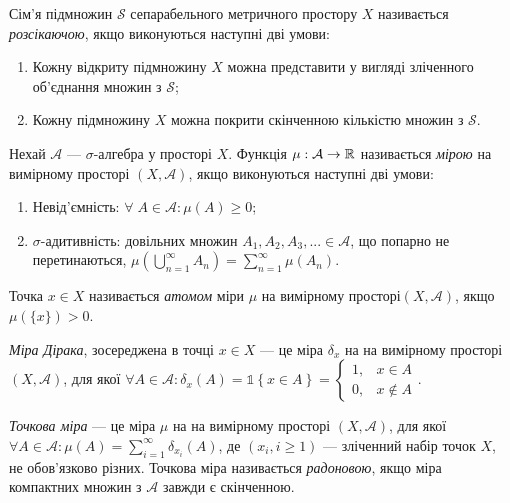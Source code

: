 \begin{definition}
    Сім'я підмножин $\mathcal{S}$ сепарабельного метричного простору $X$ називається
    \emph{розсікаючою}, якщо виконуються наступні дві умови:
    \begin{enumerate}
        \item Кожну відкриту підмножину $X$ можна представити у 
        вигляді зліченного об'єднання множин з $\mathcal{S}$;
        \item Кожну підмножину $X$ можна покрити скінченною кількістю множин з $\mathcal{S}$.
    \end{enumerate}
\end{definition}
\begin{definition}
    Нехай $\mathcal{A}$ --- $\sigma$-алгебра
    у просторі $X$. Функція $\mu: \mathcal{A} \to \mathbb{R}$ називається
    \emph{мірою} на вимірному просторі $\left(X, \mathcal{A}\right)$, якщо виконуються наступні дві умови:
    \begin{enumerate}
        \item Невід'ємність: $\forall \; A \in \mathcal{A} : \mu(A) \geq 0$;
        \item $\sigma$-адитивність: довільних множин $A_1, A_2, A_3, ... \in \mathcal{A}$,
        що попарно не перетинаються, 
        $\mu\left(\bigcup_{n=1}^{\infty} A_n\right) = \sum_{n=1}^{\infty}\mu(A_n)$.
    \end{enumerate}
\end{definition}
\begin{definition}
    Точка $x \in X$ називається \emph{атомом} міри $\mu$ на
    вимірному просторі$\left(X, \mathcal{A}\right)$, якщо $\mu\left(\{x \}\right) > 0$.
\end{definition}
\begin{definition}
    \emph{Міра Дірака}, зосереджена
    в точці $x \in X$ --- це міра $\delta_x$ на 
    на вимірному просторі $\left(X, \mathcal{A}\right)$,
    для якої $\forall A \in \mathcal{A}: \delta_x(A) = \mathds{1}\left\{x \in A\right\} = 
    \begin{cases}
        1, & x \in A \\
        0, & x \notin A
    \end{cases}$.
\end{definition}
\begin{definition}
    \emph{Точкова міра} --- це міра $\mu$ на 
    на вимірному просторі $\left(X, \mathcal{A}\right)$,
    для якої $\forall A \in \mathcal{A}: \mu(A) = \sum_{i=1}^{\infty} \delta_{x_i}(A)$,
    де $\left(x_i, i \geq 1\right)$ --- зліченний набір точок $X$, не обов'язково різних.
    Точкова міра називається \emph{радоновою},
    якщо міра компактних множин з $\mathcal{A}$ завжди є скінченною.
\end{definition}
